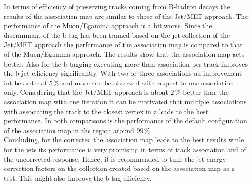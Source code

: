 In terms of efficiency of preserving tracks coming from B-hadron decays the results of the association map are similar to those of the Jet/MET approach. The performance of the Muon/Egamma approach is a bit worse. Since the discriminant of the b tag has been trained based on the jet collection of the Jet/MET approach the performance of the association map is compared to that of the Muon/Egamma approach. The results show that the association map acts better. Also for the b tagging executing more than association per track improves the b-jet efficiency significantly. With two or three associations an improvement int he order of $5\,\%$ and more can be observed with respect to one association only. Considering that the Jet/MET approach is about $2\,\%$ better than the association map with one iteration it can be motivated that multiple associations with associating the track to the closest vertex in z leads to the best performance. In both comparisons is the performance of the default configuration of the association map in the region around $99\,\%$. \\
Concluding, for the corrected \MET{} the association map leads to the best results while for the jets its performance is very promising in terms of track association and of the uncorrected \pt{} response. Hence, it is recommended to tune the jet energy correction factors on the collection created based on the association map as a test. This might also improve the b-tag efficiency.
